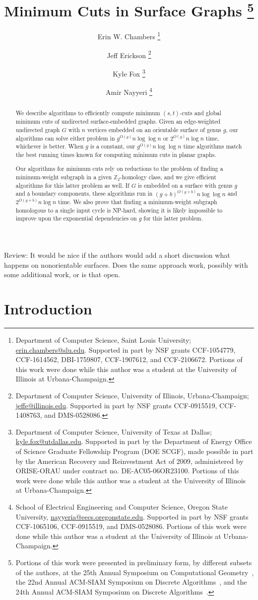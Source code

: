 \documentclass[letterpaper,review]{siamart190516}
\title{Minimum Cuts in Surface Graphs%
\thanks{
Portions of this work were presented in preliminary form, by different subsets of the authors, at
the 25th Annual Symposium on Computational Geometry~\cite{cen-mcshc-09}, the 22nd Annual ACM-SIAM
Symposium on Discrete Algorithms~\cite{en-mcsnc-11}, and the 24th Annual ACM-SIAM Symposium on Discrete Algorithms~\cite{efn-gmcse-12}.
}}
\author{
Erin W. Chambers%
	\thanks{Department of Computer Science,
	Saint Louis University;
	\url{erin.chambers@slu.edu}.
	Supported in part by NSF grants CCF-1054779, CCF-1614562, DBI-1759807, CCF-1907612, and CCF-2106672.
	Portions of this work were done while this author was a student at the University of Illinois at Urbana-Champaign.}
%
\and
Jeff Erickson%
	\thanks{Department of Computer Science,
	University of Illinois, Urbana-Champaign;
	\url{jeffe@illinois.edu}.
	Supported in part by NSF grants CCF-0915519, CCF-1408763, and DMS-0528086.
  }
%
\and
Kyle Fox%
	\thanks{Department of Computer Science,
	University of Texas at Dallas;
	\url{kyle.fox@utdallas.edu}.
	Supported in part by the Department of Energy Office of Science Graduate Fellowship Program (DOE SCGF), made possible in part by the American Recovery and Reinvestment Act of 2009, administered by ORISE-ORAU under contract no. DE-AC05-06OR23100.
	Portions of this work were done while this author was a student at the University of Illinois at Urbana-Champaign.}
%
\and
Amir Nayyeri%
	\thanks{School of Electrical Engineering and Computer Science,
	Oregon State University,
	\url{nayyeria@eecs.oregonstate.edu}.
	Supported in part by NSF grants CCF-1065106, CCF-0915519, and DMS-0528086.
	Portions of this work were done while this author was a student at the University of Illinois at Urbana-Champaign.}
}
\def\Z{\mathbb{Z}}
\def\rnote#1{\color{red}Review: #1 \color{black}}
\begin{document}
\maketitle
\begin{abstract}
We describe algorithms to efficiently compute minimum $(s,t)$-cuts and global minimum cuts of
undirected surface-embedded graphs.
Given an edge-weighted undirected graph $G$ with $n$ vertices embedded on an orientable surface of
genus $g$, our algorithms can solve either problem in $g^{O(g)} n \log \log n$ or $2^{O(g)} n \log
n$ time, whichever is better.
When $g$ is a constant, our $g^{O(g)} n \log \log n$ time algorithms match the best running times
known for computing minimum cuts in planar graphs.

Our algorithms for minimum cuts rely on reductions to the problem of finding a minimum-weight
subgraph in a given \(\Z_2\)-homology class, and we give efficient algorithms for this latter
problem as well.
If $G$ is embedded on a surface with genus $g$ and $b$ boundary components, these algorithms run in $(g + b)^{O(g
+ b)} n \log \log n$ and $2^{O(g + b)} n \log n$ time.
We also prove that finding a minimum-weight subgraph homologous to a single input cycle is NP-hard,
showing it is likely impossible to improve upon the exponential dependencies on $g$ for this latter
problem.
\end{abstract}

\rnote{
It would be nice if the authors would add a short discussion what happens on nonorientable surfaces. Does the same approach work, possibly with some additional work, or is that open. 
}


\section{Introduction}
\label{sec:intro}
\end{document}
